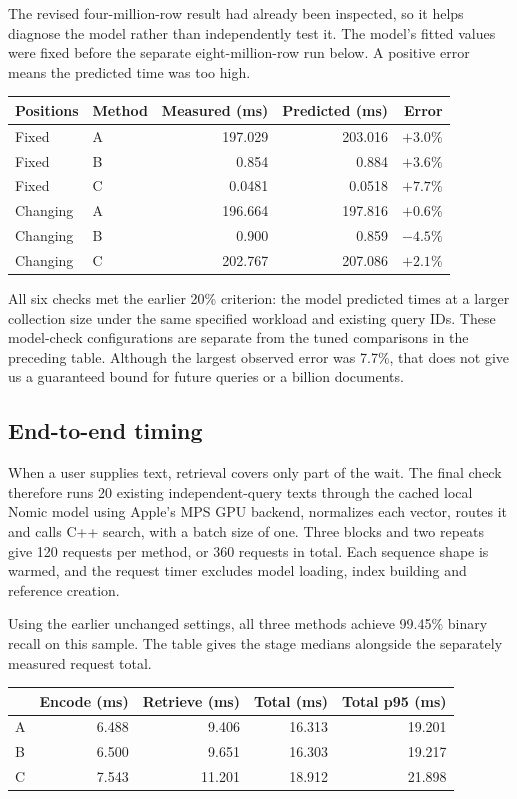 The revised four-million-row result had already been inspected, so it helps diagnose the
model rather than independently test it. The model's fitted values were fixed before the
separate eight-million-row run below. A positive error means the predicted time was too high.

\begin{center}
\begin{tabular}{@{}llrrr@{}}
\toprule
Positions & Method & Measured (ms) & Predicted (ms) & Error\\
\midrule
Fixed & A & 197.029 & 203.016 & $+3.0\%$\\
Fixed & B & 0.854 & 0.884 & $+3.6\%$\\
Fixed & C & 0.0481 & 0.0518 & $+7.7\%$\\
Changing & A & 196.664 & 197.816 & $+0.6\%$\\
Changing & B & 0.900 & 0.859 & $-4.5\%$\\
Changing & C & 202.767 & 207.086 & $+2.1\%$\\
\bottomrule
\end{tabular}
\end{center}

All six checks met the earlier 20\% criterion: the model predicted times at a larger
collection size under the same specified workload and existing query IDs. These model-check configurations are
separate from the tuned comparisons in the preceding table. Although the largest
observed error was 7.7\%, that does not give us a guaranteed bound for future queries or
a billion documents.

\subsection{End-to-end timing}
When a user supplies text, retrieval covers only part of the wait. The final check therefore
runs 20 existing independent-query texts through the cached local Nomic model using Apple's
MPS GPU backend, normalizes each vector, routes it and calls C++ search, with a batch size of one.
Three blocks and two repeats give 120 requests per method, or 360 requests in total. Each
sequence shape is warmed, and the request timer excludes model loading, index building
and reference creation.

Using the earlier unchanged settings, all three methods achieve 99.45\% binary recall on this
sample. The table gives the stage medians alongside the separately measured request total.

\begin{center}
\begin{tabular}{@{}lrrrr@{}}
\toprule
 & Encode (ms) & Retrieve (ms) & Total (ms) & Total p95 (ms)\\
\midrule
A & 6.488 & 9.406 & 16.313 & 19.201\\
B & 6.500 & 9.651 & 16.303 & 19.217\\
C & 7.543 & 11.201 & 18.912 & 21.898\\
\bottomrule
\end{tabular}
\end{center}


